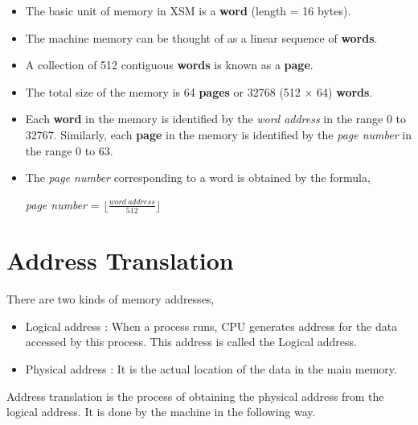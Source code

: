 \documentclass[11pt]{report}
\begin{document}

\begin{itemize}
\item The basic unit of memory in XSM is a \textbf{word} (length = 16 bytes).
\item The machine memory can be thought of as a linear sequence of \textbf{words}.
\item A collection of 512 contiguous \textbf{words} is known as a \textbf{page}.
\item The total size of the memory is 64 \textbf{pages} or 32768 (512 $\times$ 64) \textbf{words}.
\item Each \textbf{word} in the memory is identified by the \textit{word address} in the range 0 to 32767. Similarly, each \textbf{page} in the memory is identified by the \textit{page number} in the range 0 to 63.
\item The \textit{page number} corresponding to a word is obtained by the formula,
\begin{center}
 \textit{ page number }= $\lfloor \frac{word\ address}{512} \rfloor$
\end{center}
\end{itemize}



\section{Address Translation}

There are two kinds of memory addresses,

\begin{itemize}
\item Logical address : When a process runs, CPU generates address for the data accessed by this process. This address is called the Logical address.

\item Physical address : It is the actual location of the data in the main memory.
\end{itemize}

Address translation is the process of obtaining the physical address from the logical address. It is done by the machine in the following way.
 
\end{document}
